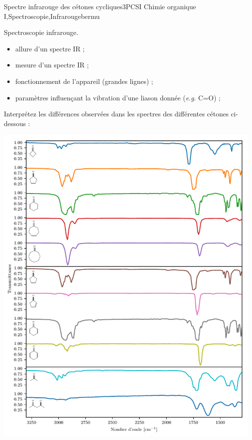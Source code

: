 
\begin{exercise}{Spectre infrarouge des cétones cycliques}{3}{PCSI}
{Chimie organique I,Spectroscopie,Infrarouge}{bermu}

\begin{questions}
    \questioncours Spectroscopie infrarouge.
\begin{itemize}
    \item allure d'un spectre IR ;
    \item mesure d'un spectre IR ;
    \item fonctionnement de l'appareil (grandes lignes) ;
    \item paramètres influençant la vibration d'une liason donnée (\emph{e.g.} C=O) ;
\end{itemize}
    \question Interprétez les différences observées dans les spectres des différentes cétones ci-dessous :
\end{questions}
\noindent\includegraphics[width=\linewidth]{chimiePC/orga/cetones_ir_fig.pdf}
\end{exercise}